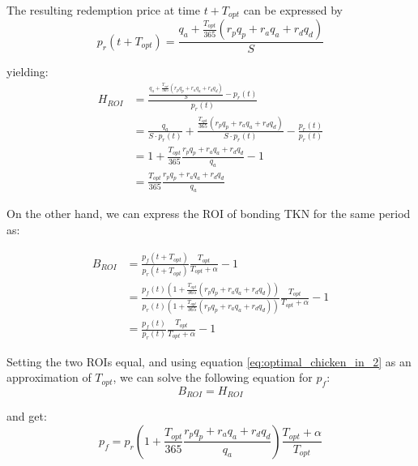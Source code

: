 \documentclass{article}
\begin{document}
The resulting redemption price at time $t + T_{opt}$ can be expressed by
\begin{equation}
  \label{eq:redemption-price}
    p_r(t + T_{opt}) = \frac{q_a + \frac{T_{opt}}{365} (r_p q_p + r_a q_a + r_d q_d)}{S}
\end{equation}

yielding:
\begin{equation}
  \label{eq:ROI-eq2}
  \begin{split}
    H_{ROI} & = \frac{\frac{q_a + \frac{T_{opt}}{365} (r_p q_p + r_a q_a + r_d q_d)}{S} - p_r(t)}{p_r(t)} \\
    & = \frac{q_a}{S \cdot p_r(t)} + \frac{\frac{T_{opt}}{365} (r_p q_p + r_a q_a + r_d q_d)}{S\cdot p_r(t)} - \frac{p_r(t)}{p_r(t)} \\
    & = 1 + \frac{T_{opt}}{365} \frac{r_p q_p + r_a q_a + r_d q_d}{q_a} - 1 \\
    & = \frac{T_{opt}}{365} \frac{r_p q_p + r_a q_a + r_d q_d}{q_a}
  \end{split}
\end{equation}

On the other hand, we can express the ROI of bonding TKN for the same period as:

\begin{equation}
  \label{eq:ROI-bonding}
  \begin{split}
    B_{ROI} & = \frac{p_f(t+T_{opt})}{p_r(t+T_{opt})}\frac{T_{opt}}{T_{opt}+\alpha} - 1 \\
    & = \frac{p_f(t)(1 + \frac{T_{opt}}{365} (r_p q_p + r_a q_a + r_d q_d))} {p_r(t)(1 + \frac{T_{opt}}{365} (r_p q_p + r_a q_a + r_d q_d))}    \frac{T_{opt}}{T_{opt}+\alpha} - 1 \\ 
    & = \frac{p_f(t)}{p_r(t)}\frac{T_{opt}}{T_{opt}+\alpha} - 1
  \end{split}
\end{equation}

Setting the two ROIs equal, and using equation \ref{eq:optimal_chicken_in_2} as an approximation of $T_{opt}$, we can solve the following equation for $p_f$:
\begin{equation}
  \label{eq:ROI-bonding-holding}
  B_{ROI} = H_{ROI}
\end{equation}

and get:
\begin{equation}
  \label{eq:ROI-bonding-holding-2}
  p_f = p_r\left(1 + \frac{T_{opt}}{365} \frac{r_p q_p + r_a q_a + r_d q_d}{q_a}\right) \frac{T_{opt}+\alpha}{T_{opt}}
\end{equation}
\end{document}
